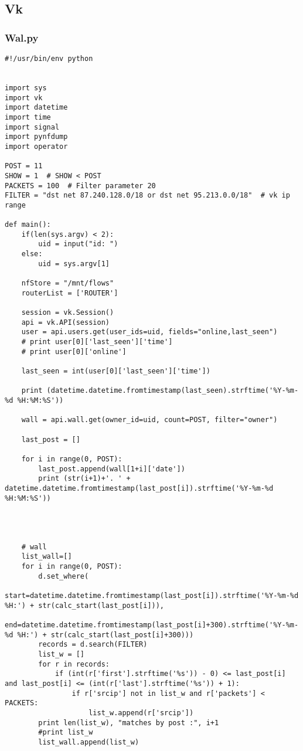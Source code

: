 \subsection{Vk}
\subsubsection{Wal.py}
\begin{lstlisting}
#!/usr/bin/env python


import sys
import vk
import datetime
import time
import signal
import pynfdump
import operator

POST = 11
SHOW = 1  # SHOW < POST
PACKETS = 100  # Filter parameter 20
FILTER = "dst net 87.240.128.0/18 or dst net 95.213.0.0/18"  # vk ip range

def main():
    if(len(sys.argv) < 2):
        uid = input("id: ")
    else:
        uid = sys.argv[1]

    nfStore = "/mnt/flows"
    routerList = ['ROUTER']

    session = vk.Session()
    api = vk.API(session)
    user = api.users.get(user_ids=uid, fields="online,last_seen")
    # print user[0]['last_seen']['time']
    # print user[0]['online']

    last_seen = int(user[0]['last_seen']['time'])

    print (datetime.datetime.fromtimestamp(last_seen).strftime('%Y-%m-%d %H:%M:%S'))

    wall = api.wall.get(owner_id=uid, count=POST, filter="owner")

    last_post = []

    for i in range(0, POST):
        last_post.append(wall[1+i]['date'])
        print (str(i+1)+'. ' + datetime.datetime.fromtimestamp(last_post[i]).strftime('%Y-%m-%d %H:%M:%S'))




    # wall
    list_wall=[]
    for i in range(0, POST):
        d.set_where(
            start=datetime.datetime.fromtimestamp(last_post[i]).strftime('%Y-%m-%d %H:') + str(calc_start(last_post[i])),
            end=datetime.datetime.fromtimestamp(last_post[i]+300).strftime('%Y-%m-%d %H:') + str(calc_start(last_post[i]+300)))
        records = d.search(FILTER)
        list_w = []
        for r in records:
            if (int(r['first'].strftime('%s')) - 0) <= last_post[i] and last_post[i] <= (int(r['last'].strftime('%s')) + 1):
                if r['srcip'] not in list_w and r['packets'] < PACKETS:
                    list_w.append(r['srcip'])
        print len(list_w), "matches by post :", i+1
        #print list_w
        list_wall.append(list_w)



\end{lstlisting}
